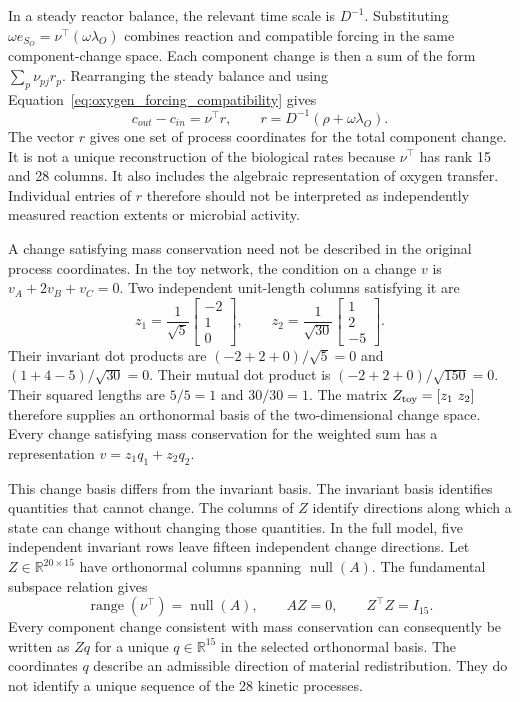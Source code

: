 In a steady reactor balance, the relevant time scale is $D^{-1}$. Substituting $\omega e_{S_O}=\nu^\top(\omega\lambda_O)$ combines reaction and compatible forcing in the same component-change space. Each component change is then a sum of the form $\sum_p\nu_{pj}r_p$. Rearranging the steady balance and using Equation~\eqref{eq:oxygen_forcing_compatibility} gives
\begin{equation}
c_{out}-c_{in}=\nu^\top r,\qquad
r=D^{-1}(\rho+\omega\lambda_O).
\label{eq:reaction_progress_coordinates}
\end{equation}
The vector $r$ gives one set of process coordinates for the total component change. It is not a unique reconstruction of the biological rates because $\nu^\top$ has rank 15 and 28 columns. It also includes the algebraic representation of oxygen transfer. Individual entries of $r$ therefore should not be interpreted as independently measured reaction extents or microbial activity.

A change satisfying mass conservation need not be described in the original process coordinates. In the toy network, the condition on a change $v$ is $v_A+2v_B+v_C=0$. Two independent unit-length columns satisfying it are
\[
z_1=\frac1{\sqrt5}\begin{bmatrix}-2\\1\\0\end{bmatrix},\qquad
z_2=\frac1{\sqrt{30}}\begin{bmatrix}1\\2\\-5\end{bmatrix}.
\]
Their invariant dot products are $(-2+2+0)/\sqrt5=0$ and $(1+4-5)/\sqrt{30}=0$. Their mutual dot product is $(-2+2+0)/\sqrt{150}=0$. Their squared lengths are $5/5=1$ and $30/30=1$. The matrix $Z_{\rm toy}=[z_1\ z_2]$ therefore supplies an orthonormal basis of the two-dimensional change space. Every change satisfying mass conservation for the weighted sum has a representation $v=z_1q_1+z_2q_2$.

This change basis differs from the invariant basis. The invariant basis identifies quantities that cannot change. The columns of $Z$ identify directions along which a state can change without changing those quantities. In the full model, five independent invariant rows leave fifteen independent change directions. Let $Z\in\mathbb{R}^{20\times15}$ have orthonormal columns spanning $\operatorname{null}(A)$. The fundamental subspace relation gives
\begin{equation}
\operatorname{range}(\nu^\top)=\operatorname{null}(A),\qquad
AZ=0,\qquad Z^\top Z=I_{15}.
\label{eq:reaction_invariant_subspaces}
\end{equation}
Every component change consistent with mass conservation can consequently be written as $Zq$ for a unique $q\in\mathbb{R}^{15}$ in the selected orthonormal basis. The coordinates $q$ describe an admissible direction of material redistribution. They do not identify a unique sequence of the 28 kinetic processes.

